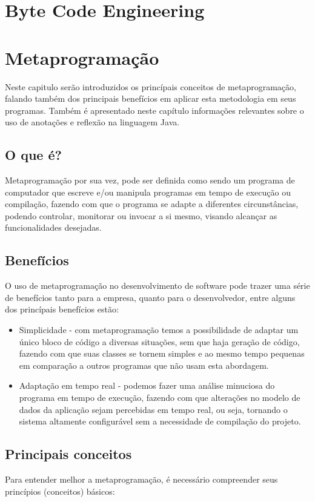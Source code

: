 \documentclass[tc,openright]{iiufrgs}
\begin{document}
\chapter{Byte Code Engineering}

\chapter{Metaprogramação}
Neste capitulo serão introduzidos  os princípais conceitos de metaprogramação, falando também dos principais benefícios em aplicar esta metodologia em seus programas. Também é apresentado neste capítulo informações relevantes sobre o uso de anotações e reflexão na linguagem Java.

\section{O que é?}

Metaprogramação por sua vez, pode ser definida como sendo um programa de computador que escreve e/ou manipula programas em tempo de execução ou compilação, fazendo com que o programa se adapte a diferentes circunstâncias, podendo controlar, monitorar ou invocar a si mesmo, visando alcançar as funcionalidades desejadas. \cite{hazzard2013metaprogramming}
\section{Benefícios}
O uso de metaprogramação no desenvolvimento de software pode trazer uma série de benefícios tanto para a empresa, quanto para o desenvolvedor, entre alguns dos princípais benefícios estão:

\begin{itemize}
\item Simplicidade - com metaprogramação temos a possibilidade de adaptar um único bloco de código a diversas situações, sem que haja geração de código, fazendo com que suas classes se tornem simples e ao mesmo tempo pequenas em comparação a outros programas que não usam esta abordagem.
\item Adaptação em tempo real - podemos fazer uma análise minuciosa do programa em tempo de execução, fazendo com que alterações no modelo de dados da aplicação sejam percebidas em tempo real, ou seja, tornando o sistema altamente configurável sem a necessidade de compilação do projeto.
\end{itemize}

\section{Principais conceitos}
Para entender melhor a metaprogramação, é necessário compreender seus princípios (conceitos) básicos:
\end{document}
